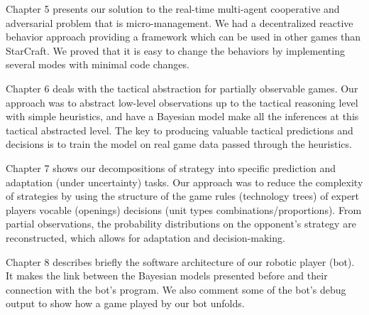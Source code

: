 Chapter 5 presents our solution to the real-time multi-agent cooperative and adversarial problem that is micro-management. We had a decentralized reactive behavior approach providing a framework which can be used in other games than StarCraft. We proved that it is easy to change the behaviors by implementing several modes with minimal code changes.

Chapter 6 deals with the tactical abstraction for partially observable games. Our approach was to abstract low-level observations up to the tactical reasoning level with simple heuristics, and have a Bayesian model make all the inferences at this tactical abstracted level. The key to producing valuable tactical predictions and decisions is to train the model on real game data passed through the heuristics.

Chapter 7 shows our decompositions of strategy into specific prediction and adaptation (under uncertainty) tasks. Our approach was to reduce the complexity of strategies by using the structure of the game rules (technology trees) of expert players vocable (openings) decisions (unit types combinations/proportions). From partial observations, the probability distributions on the opponent's strategy are reconstructed, which allows for adaptation and decision-making.

Chapter 8 describes briefly the software architecture of our robotic player (bot). It makes the link between the Bayesian models presented before and their connection with the bot's program. We also comment some of the bot's debug output to show how a game played by our bot unfolds.



